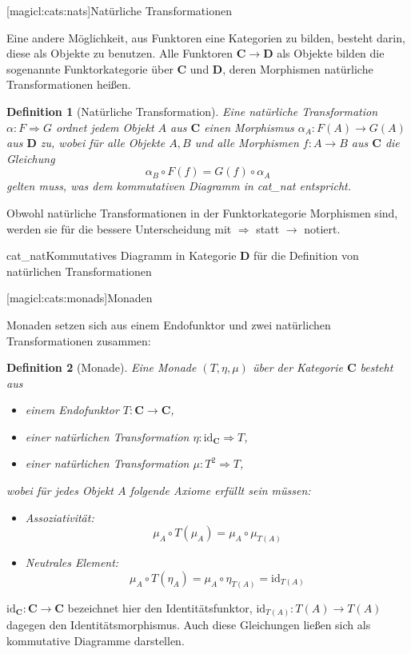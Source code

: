 \documentclass[a4paper, bibgerm]{book}
\newcommand\lsubsection{}
\newcommand\abb{}
\newcommand\fig{}
\newcommand\ato{\rightarrow} %
\newcommand\nto{\Rightarrow} %
\newtheorem{defini}{Definition}
\newcommand{\defi}[2]{%
  \begin{defini}[#1]
    \label{def:#1}
    #2
  \end{defini}
}
\begin{document}
\lsubsection[magicl:cats:nats]{Natürliche Transformationen}

Eine andere Möglichkeit, aus Funktoren eine Kategorien zu bilden,
besteht darin, diese als Objekte zu benutzen. Alle Funktoren $\mathbf{C}
\ato \mathbf{D}$ als Objekte bilden die sogenannte Funktorkategorie über
$\mathbf{C}$ und $\mathbf{D}$, deren Morphismen natürliche
Transformationen heißen. 

\defi{Natürliche Transformation}{Eine natürliche Transformation $\alpha:F \nto
G$ ordnet jedem Objekt $A$ aus $\mathbf{C}$ einen Morphismus
$\alpha_A:F(A) \ato G(A)$ aus $\mathbf{D}$ zu, wobei für alle Objekte
$A,B$ und alle Morphismen $f:A \ato B$ aus $\mathbf{C}$ die
Gleichung
$$\alpha_B \circ F(f) = G(f) \circ \alpha_A $$
gelten muss, was dem kommutativen Diagramm in \abb{cat_nat}
entspricht.
}

Obwohl natürliche Transformationen in der Funktorkategorie Morphismen
sind, werden sie für die bessere Unterscheidung mit $\nto$ statt
$\ato$ notiert.

\fig{cat_nat}{Kommutatives Diagramm in Kategorie $\mathbf{D}$ für die Definition von
  natürlichen Transformationen}

\lsubsection[magicl:cats:monads]{Monaden}

Monaden setzen sich aus einem Endofunktor und zwei natürlichen
Transformationen zusammen:
\defi{Monade}{Eine Monade $(T,\eta,\mu)$ über der Kategorie $\mathbf{C}$ besteht aus
  \begin{itemize}
  \item einem Endofunktor $T:\mathbf{C} \ato \mathbf{C}$,
  \item einer natürlichen Transformation $\eta:\mathrm{id}_{\mathbf{C}} \nto T$,
  \item einer natürlichen Transformation $\mu:T^2 \nto T$,
  \end{itemize}
wobei für jedes Objekt $A$ folgende Axiome erfüllt sein müssen:
\begin{itemize}
\item Assoziativität: $$\mu_A \circ T(\mu_A) = \mu_A \circ \mu_{T(A)}$$
\item Neutrales Element: $$\mu_A \circ T(\eta_A) = \mu_A \circ \eta_{T(A)} = \mathrm{id}_{T(A)}$$
\end{itemize}
}
$\mathrm{id}_\mathbf{C}:\mathbf{C} \ato \mathbf{C}$ bezeichnet hier den Identitätsfunktor,
$\mathrm{id}_{T(A)}:T(A) \ato T(A)$ dagegen den Identitätsmorphismus. Auch diese Gleichungen ließen sich
als kommutative Diagramme darstellen.  
\end{document}
